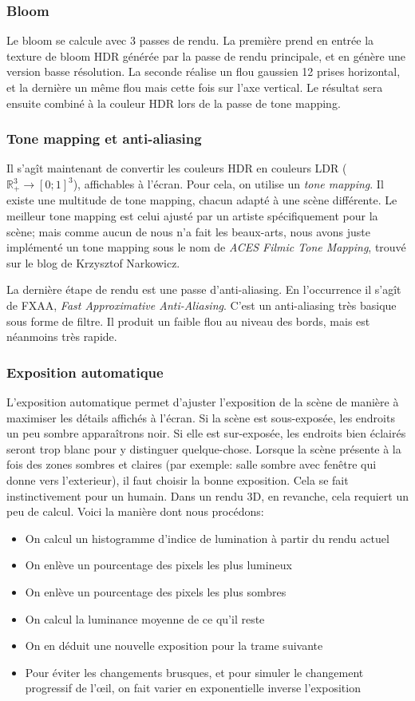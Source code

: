 \documentclass[a4paper,12pt]{article}
\begin{document}
\subsubsection{Bloom}
Le bloom se calcule avec 3 passes de rendu. La première prend en entrée la texture de bloom HDR générée par la passe de rendu principale,
et en génère une version basse résolution. La seconde réalise un flou gaussien 12 prises horizontal, et la dernière un même flou mais cette
fois sur l'axe vertical. Le résultat sera ensuite combiné à la couleur HDR lors de la passe de tone mapping.

\subsubsection{Tone mapping et anti-aliasing}
Il s'agît maintenant de convertir les couleurs HDR en couleurs LDR ($\mathbb{R}_+^3 \to [0; 1]^3$), affichables à l'écran.
Pour cela, on utilise un \emph{tone mapping}. Il existe une multitude de tone mapping, chacun adapté à une scène différente.
Le meilleur tone mapping est celui ajusté par un artiste spécifiquement pour la scène; mais comme aucun de nous n'a fait les
beaux-arts, nous avons juste implémenté un tone mapping sous le nom de \emph{ACES Filmic Tone Mapping}, trouvé sur le blog de
Krzysztof Narkowicz.

La dernière étape de rendu est une passe d'anti-aliasing. En l'occurrence il s'agît de FXAA, \emph{Fast Approximative Anti-Aliasing}.
C'est un anti-aliasing très basique sous forme de filtre. Il produit un faible flou au niveau des bords, mais est néanmoins très rapide.

\subsubsection{Exposition automatique}
L'exposition automatique permet d'ajuster l'exposition de la scène de manière à maximiser les détails affichés à l'écran. Si la scène
est sous-exposée, les endroits un peu sombre apparaîtrons noir. Si elle est sur-exposée, les endroits bien éclairés seront trop blanc
pour y distinguer quelque-chose. Lorsque la scène présente à la fois des zones sombres et claires (par exemple: salle sombre avec fenêtre
qui donne vers l'exterieur), il faut choisir la bonne exposition. Cela se fait instinctivement pour un humain. Dans un rendu 3D, en revanche,
cela requiert un peu de calcul. Voici la manière dont nous procédons:
\begin{itemize}
    \item On calcul un histogramme d'indice de lumination à partir du rendu actuel
    \item On enlève un pourcentage des pixels les plus lumineux
    \item On enlève un pourcentage des pixels les plus sombres
    \item On calcul la luminance moyenne de ce qu'il reste
    \item On en déduit une nouvelle exposition pour la trame suivante
    \item Pour éviter les changements brusques, et pour simuler le changement progressif de l'œil, on fait varier en exponentielle inverse l'exposition
\end{itemize}
\end{document}
